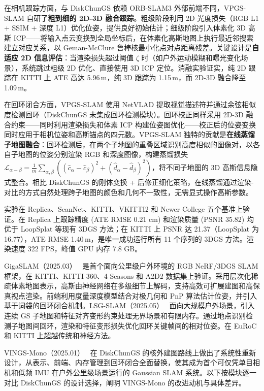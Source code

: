 在相机跟踪方面，与 DiskChunGS 依赖 ORB-SLAM3 外部前端不同，VPGS-SLAM 自研了\textbf{粗到细的 2D-3D 融合跟踪}。粗级阶段利用 2D 光度损失（RGB L1 + SSIM + 深度 L1）优化位姿，提供良好初始估计；细级阶段引入体素化 3D 高斯 ICP——将输入点云变换到全局坐标后，在体素化高斯地图上执行最近邻搜索建立对应关系，以 Geman-McClure 鲁棒核最小化点对点距离残差。关键设计是\textbf{自适应 2D 信息评估}：当渲染损失超过阈值 $\zeta$ 时（如户外运动模糊和曝光变化场景），系统跳过粗级 2D 优化、直接使用 3D ICP 定位。消融实验证实，纯 2D 跟踪在 KITTI 上 ATE 高达 5.96\,m，纯 3D 跟踪为 1.15\,m，而 2D-3D 融合降至 1.09\,m。

在回环闭合方面，VPGS-SLAM 使用 NetVLAD 提取视觉描述符并通过余弦相似度检测回环（DiskChunGS 未集成回环检测模块）。回环校正同样采用 2D-3D 融合约束——同时利用渲染损失和体素 ICP 构建位姿图优化——校正后的位姿变换同时应用于相机位姿和高斯锚点的四元数。VPGS-SLAM 独特的贡献是\textbf{在线蒸馏子地图融合}：回环检测后，在两个子地图的重叠区域识别高度相似的图像对，以各自子地图的位姿分别渲染 RGB 和深度图像，构建蒸馏损失 $\mathcal{L}_{\alpha-\beta} = \frac{1}{m}\sum_{\alpha,\beta}((\hat{c}_\alpha - \hat{c}_\beta)^2 + (\hat{d}_\alpha - \hat{d}_\beta)^2)$，将不同子地图的 3D 高斯信息隐式整合。相比 DiskChunGS 的刚体变换 + 后修正细化策略，在线蒸馏通过渲染-对比的方式自然处理跨子地图的颜色和几何不一致性，无需显式操作高斯参数。

实验在 Replica、ScanNet、KITTI、VKITTI2 和 Newer College 五个基准上验证。在 Replica 上跟踪精度 (ATE RMSE 0.21 cm) 和渲染质量 (PSNR 35.82) 均优于 LoopSplat 等现有 3DGS 方法；在 KITTI 上 PSNR 达 21.37（LoopSplat 为 16.77），ATE RMSE 1.40\,m，是唯一成功运行所有 11 个序列的 3DGS 方法。渲染速度 322 FPS，峰值 GPU 内存 7.8 GB。

GigaSLAM（2025.03）~\cite{2503_08071} 是首个面向公里级户外环境的 RGB NeRF/3DGS SLAM 框架，在 KITTI、KITTI 360、4 Seasons 和 A2D2 数据集上验证。采用层次化稀疏体素地图表示，高斯由神经网络在多级细节上解码，支持高效可扩展建图和高保真视点渲染。前端利用度量深度模型结合对极几何和 PnP 算法估计位姿，并引入基于词袋的回环闭合机制。LSG-SLAM（2025.05）~\cite{2505_09915} 面向大规模户外场景，引入连续 GS 子地图和特征对齐变形约束处理无界场景和有限内存。通过地点识别检测子地图间回环，渲染和特征变形损失优化回环关键帧间的相对位姿。在 EuRoC 和 KITTI 上超越传统和神经方法。

VINGS-Mono（2025.01）~\cite{2501_08286} 在 DiskChunGS 的核外建图路线上做出了系统性重新设计，从表示、前端、内存管理到回环闭合全面替换，使其成为首个可仅凭单目相机和低频 IMU 在户外公里级场景运行的 Gaussian SLAM 系统。以下按模块逐一对比 DiskChunGS 的设计选择，阐明 VINGS-Mono 的改进动机与具体差异。


